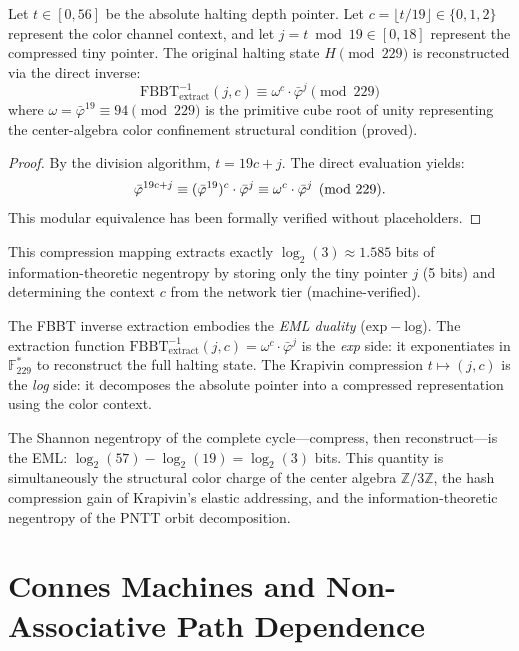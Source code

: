 \begin{theorem}
\label{thm:fbbt_inverse_extract}
Let $t \in [0, 56]$ be the absolute halting depth pointer. Let $c = \lfloor t / 19 \rfloor \in \{0, 1, 2\}$ represent the color channel context, and let $j = t \bmod 19 \in [0, 18]$ represent the compressed tiny pointer. The original halting state $H \pmod{229}$ is reconstructed via the direct inverse:
\[
\mathrm{FBBT}^{-1}_{\mathrm{extract}}(j, c) \equiv \omega^c \cdot \bar\varphi^j \pmod{229}
\]
where $\omega = \bar\varphi^{19} \equiv 94 \pmod{229}$ is the primitive cube root of unity representing the center-algebra color confinement structural condition (proved).
\end{theorem}

\begin{proof}
By the division algorithm, $t = 19c + j$. The direct evaluation yields:
\[
\bar\varphi^{19c + j} \equiv (\bar\varphi^{19})^c \cdot \bar\varphi^j \equiv \omega^c \cdot \bar\varphi^j \pmod{229}. \qedhere
\]
This modular equivalence has been formally verified without placeholders.
\end{proof}

This compression mapping extracts exactly $\log_2(3) \approx 1.585$ bits of information-theoretic negentropy by storing only the tiny pointer $j$ (5 bits) and determining the context $c$ from the network tier (machine-verified).

\begin{remark}
The FBBT inverse extraction embodies the \emph{EML duality} ($\mathrm{exp} - \mathrm{log}$). The extraction function $\mathrm{FBBT}^{-1}_{\mathrm{extract}}(j, c) = \omega^c \cdot \bar\varphi^j$ is the \emph{exp} side: it exponentiates in $\mathbb{F}_{229}^*$ to reconstruct the full halting state. The Krapivin compression $t \mapsto (j, c)$ is the \emph{log} side: it decomposes the absolute pointer into a compressed representation using the color context.

The Shannon negentropy of the complete cycle---compress, then reconstruct---is the EML: $\log_2(57) - \log_2(19) = \log_2(3)$ bits. This quantity is simultaneously the structural color charge of the center algebra $\mathbb{Z}/3\mathbb{Z}$, the hash compression gain of Krapivin's elastic addressing, and the information-theoretic negentropy of the PNTT orbit decomposition.
\end{remark}

\section{Connes Machines and Non-Associative Path Dependence}
\label{sec:connes}

